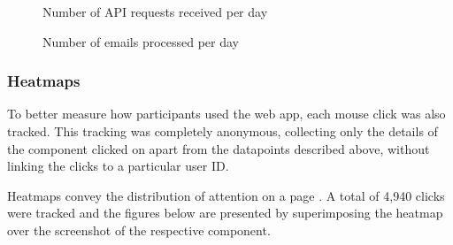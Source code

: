 \documentclass{article}
\begin{document}
\begin{figure}[h]
	\centering
	\begin{minipage}{.47\textwidth}
		\caption{Number of API requests received per day}
	\end{minipage}%
	\hspace{.5cm}
	\begin{minipage}{.47\textwidth}
		\caption{Number of emails processed per day}
	\end{minipage}
\end{figure}

\subsubsection{Heatmaps}

To better measure how participants used the web app, each mouse click was also tracked. This tracking was completely anonymous, collecting only the details of the component clicked on apart from the datapoints described above, without linking the clicks to a particular user ID.

Heatmaps convey the distribution of attention on a page \cite{gu_predicting_2020}. A total of 4,940 clicks were tracked and the figures below are presented by superimposing the heatmap over the screenshot of the respective component.
\end{document}
